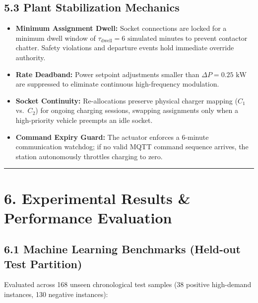 \documentclass[
]{article}
\providecommand{\tightlist}{%
  \setlength{\itemsep}{0pt}\setlength{\parskip}{0pt}}
\begin{document}
\subsection{5.3 Plant Stabilization
Mechanics}\label{plant-stabilization-mechanics}

\begin{itemize}
\tightlist
\item
  \textbf{Minimum Assignment Dwell:} Socket connections are locked for a
  minimum dwell window of
  \(\tau_{\text{dwell}} = 6\text{ simulated minutes}\) to prevent
  contactor chatter. Safety violations and departure events hold
  immediate override authority.
\item
  \textbf{Rate Deadband:} Power setpoint adjustments smaller than
  \(\Delta P = 0.25\text{ kW}\) are suppressed to eliminate continuous
  high-frequency modulation.
\item
  \textbf{Socket Continuity:} Re-allocations preserve physical charger
  mapping (\(C_1\) vs.~\(C_2\)) for ongoing charging sessions, swapping
  assignments only when a high-priority vehicle preempts an idle socket.
\item
  \textbf{Command Expiry Guard:} The actuator enforces a 6-minute
  communication watchdog; if no valid MQTT command sequence arrives, the
  station autonomously throttles charging to zero.
\end{itemize}

\vspace{0.5em}\noindent\textcolor{gridsenseblue}{\rule{\linewidth}{0.6pt}}\vspace{0.5em}

\section{6. Experimental Results \& Performance
Evaluation}\label{experimental-results-performance-evaluation}

\subsection{6.1 Machine Learning Benchmarks (Held-out Test
Partition)}\label{machine-learning-benchmarks-held-out-test-partition}

Evaluated across 168 unseen chronological test samples (38 positive
high-demand instances, 130 negative instances):
\end{document}
